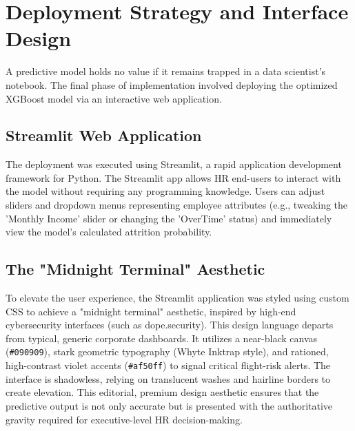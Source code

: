 \section{Deployment Strategy and Interface Design}
A predictive model holds no value if it remains trapped in a data scientist's notebook. The final phase of implementation involved deploying the optimized XGBoost model via an interactive web application.

\subsection{Streamlit Web Application}
The deployment was executed using Streamlit, a rapid application development framework for Python. The Streamlit app allows HR end-users to interact with the model without requiring any programming knowledge. Users can adjust sliders and dropdown menus representing employee attributes (e.g., tweaking the 'Monthly Income' slider or changing the 'OverTime' status) and immediately view the model's calculated attrition probability. 

\subsection{The "Midnight Terminal" Aesthetic}
To elevate the user experience, the Streamlit application was styled using custom CSS to achieve a "midnight terminal" aesthetic, inspired by high-end cybersecurity interfaces (such as dope.security). This design language departs from typical, generic corporate dashboards. It utilizes a near-black canvas (\texttt{\#090909}), stark geometric typography (Whyte Inktrap style), and rationed, high-contrast violet accents (\texttt{\#af50ff}) to signal critical flight-risk alerts. The interface is shadowless, relying on translucent washes and hairline borders to create elevation. This editorial, premium design aesthetic ensures that the predictive output is not only accurate but is presented with the authoritative gravity required for executive-level HR decision-making.
